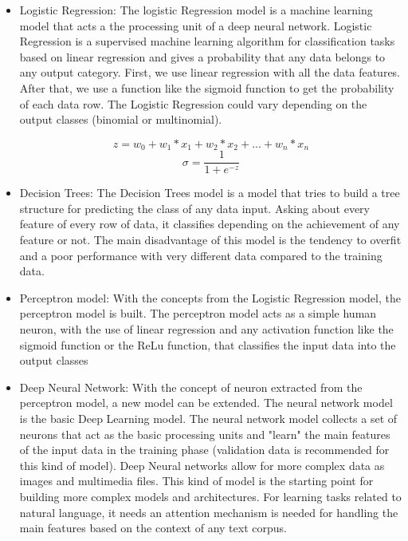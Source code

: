 \begin{itemize}
	\item Logistic Regression: The logistic Regression model is a machine learning model that acts a the processing unit of a deep neural network. Logistic Regression is a supervised machine learning algorithm for classification tasks based on linear regression and gives a probability that any data belongs to any output category. First, we use linear regression with all the data features. After that, we use a function like the sigmoid function to get the probability of each data row. The Logistic Regression could vary depending on the output classes (binomial or multinomial).
	
	\begin{equation}
		z = w_0 + w_1*x_1 + w_2 * x_2 + ... + w_n*x_n
	\end{equation}
	\begin{equation}
		\sigma = \frac{1}{1 + e^{-z}}
	\end{equation}
	\item Decision Trees: The Decision Trees model is a model that tries to build a tree structure for predicting the class of any data input. Asking about every feature of every row of data, it classifies depending on the achievement of any feature or not. The main disadvantage of this model is the tendency to overfit and a poor performance with very different data compared to the training data.
	\item Perceptron model: With the concepts from the Logistic Regression model, the perceptron model is built. The perceptron model acts as a simple human neuron, with the use of linear regression and any activation function like the sigmoid function or the ReLu function, that classifies the input data into the output classes
	\item Deep Neural Network: With the concept of neuron extracted from the perceptron model, a new model can be extended. The neural network model is the basic Deep Learning model. The neural network model collects a set of neurons that act as the basic processing units and "learn" the main features of the input data in the training phase (validation data is recommended for this kind of model). Deep Neural networks allow for more complex data as images and multimedia files. This kind of model is the starting point for building more complex models and architectures. For learning tasks related to natural language, it needs an attention mechanism is needed for handling the main features based on the context of any text corpus.
\end{itemize}


